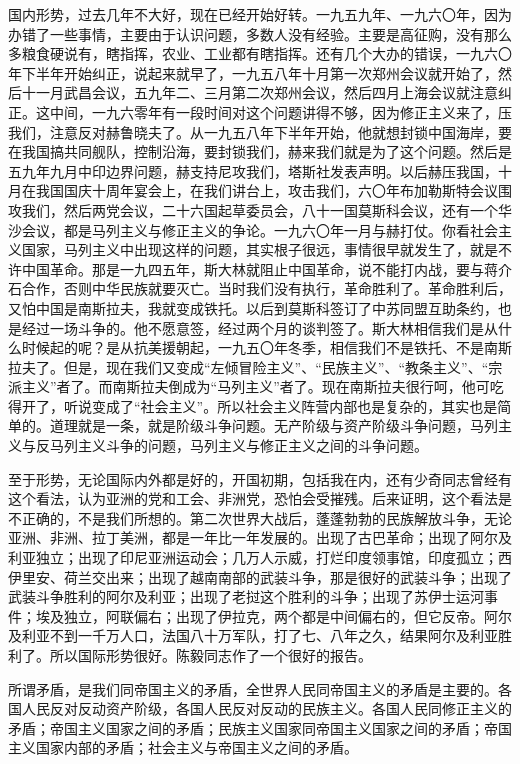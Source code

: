 国内形势，过去几年不大好，现在已经开始好转。一九五九年、一九六〇年，因为办错了一些事情，主要由于认识问题，多数人没有经验。主要是高征购，没有那么多粮食硬说有，瞎指挥，农业、工业都有瞎指挥。还有几个大办的错误，一九六〇年下半年开始纠正，说起来就早了，一九五八年十月第一次郑州会议就开始了，然后十一月武昌会议，五九年二、三月第二次郑州会议，然后四月上海会议就注意纠正。这中间，一九六零年有一段时间对这个问题讲得不够，因为修正主义来了，压我们，注意反对赫鲁晓夫了。从一九五八年下半年开始，他就想封锁中国海岸，要在我国搞共同舰队，控制沿海，要封锁我们，赫来我们就是为了这个问题。然后是五九年九月中印边界问题，赫支持尼攻我们，塔斯社发表声明。以后赫压我国，十月在我国国庆十周年宴会上，在我们讲台上，攻击我们，六〇年布加勒斯特会议围攻我们，然后两党会议，二十六国起草委员会，八十一国莫斯科会议，还有一个华沙会议，都是马列主义与修正主义的争论。一九六〇年一月与赫打仗。你看社会主义国家，马列主义中出现这样的问题，其实根子很远，事情很早就发生了，就是不许中国革命。那是一九四五年，斯大林就阻止中国革命，说不能打内战，要与蒋介石合作，否则中华民族就要灭亡。当时我们没有执行，革命胜利了。革命胜利后，又怕中国是南斯拉夫，我就变成铁托。以后到莫斯科签订了中苏同盟互助条约，也是经过一场斗争的。他不愿意签，经过两个月的谈判签了。斯大林相信我们是从什么时候起的呢？是从抗美援朝起，一九五〇年冬季，相信我们不是铁托、不是南斯拉夫了。但是，现在我们又变成“左倾冒险主义”、“民族主义”、“教条主义”、“宗派主义”者了。而南斯拉夫倒成为“马列主义”者了。现在南斯拉夫很行呵，他可吃得开了，听说变成了“社会主义”。所以社会主义阵营内部也是复杂的，其实也是简单的。道理就是一条，就是阶级斗争问题。无产阶级与资产阶级斗争问题，马列主义与反马列主义斗争的问题，马列主义与修正主义之间的斗争问题。

至于形势，无论国际内外都是好的，开国初期，包括我在内，还有少奇同志曾经有这个看法，认为亚洲的党和工会、非洲党，恐怕会受摧残。后来证明，这个看法是不正确的，不是我们所想的。第二次世界大战后，蓬蓬勃勃的民族解放斗争，无论亚洲、非洲、拉丁美洲，都是一年比一年发展的。出现了古巴革命；出现了阿尔及利亚独立；出现了印尼亚洲运动会；几万人示威，打烂印度领事馆，印度孤立；西伊里安、荷兰交出来；出现了越南南部的武装斗争，那是很好的武装斗争；出现了武装斗争胜利的阿尔及利亚；出现了老挝这个胜利的斗争；出现了苏伊士运河事件；埃及独立，阿联偏右；出现了伊拉克，两个都是中间偏右的，但它反帝。阿尔及利亚不到一千万人口，法国八十万军队，打了七、八年之久，结果阿尔及利亚胜利了。所以国际形势很好。陈毅同志作了一个很好的报告。

所谓矛盾，是我们同帝国主义的矛盾，全世界人民同帝国主义的矛盾是主要的。各国人民反对反动资产阶级，各国人民反对反动的民族主义。各国人民同修正主义的矛盾；帝国主义国家之间的矛盾；民族主义国家同帝国主义国家之间的矛盾；帝国主义国家内部的矛盾；社会主义与帝国主义之间的矛盾。

